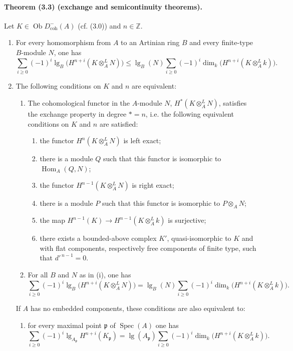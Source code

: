\documentclass[10pt]{article}
\newcommand{\Z}{\mathbb Z}
\newcommand{\Hom}{\operatorname{Hom}}
\providecommand{\Spec}{\operatorname{Spec}}
\providecommand{\lgop}{\operatorname{lg}}
\providecommand{\Ob}{\operatorname{Ob}}
\begin{document}
\paragraph{Theorem (3.3) (exchange and semicontinuity theorems).} Let $K\in\Ob D^-_{\mathrm{coh}}(A)$ (cf. (3.0)) and $n\in\Z$.
\begin{enumerate}[label=(\roman*)]
\item For every homomorphism from $A$ to an Artinian ring $B$ and every finite-type $B$-module $N$, one has
\[
\tag{3.3.1}
\sum_{i\ge0}(-1)^i\lgop_B\bigl(H^{n+i}(K\otimes_A^L N)\bigr)
\le
\lgop_B(N)\sum_{i\ge0}(-1)^i\dim_k\bigl(H^{n+i}(K\otimes_A^L k)\bigr).
\]
\item The following conditions on $K$ and $n$ are equivalent:
\begin{enumerate}[label=\alph*)]
\item The cohomological functor in the $A$-module $N$, $H^*(K\otimes_A^L N)$, satisfies the exchange property in degree $*=n$, i.e. the following equivalent conditions on $K$ and $n$ are satisfied:
\begin{enumerate}[label=a.\arabic*)]
\item the functor $H^n(K\otimes_A^L N)$ is left exact;
\item there is a module $Q$ such that this functor is isomorphic to $\Hom_A(Q,N)$;
\item the functor $H^{n-1}(K\otimes_A^L N)$ is right exact;
\item there is a module $P$ such that this functor is isomorphic to $P\otimes_A N$;
\item the map $H^{n-1}(K)\to H^{n-1}(K\otimes_A^L k)$ is surjective;
\item there exists a bounded-above complex $K'$, quasi-isomorphic to $K$ and with flat components, respectively free components of finite type, such that $d'^{\,n-1}=0$.
\end{enumerate}
\item For all $B$ and $N$ as in (i), one has
\[
\tag{3.3.2}
\sum_{i\ge0}(-1)^i\lgop_B\bigl(H^{n+i}(K\otimes_A^L N)\bigr)
=
\lgop_B(N)\sum_{i\ge0}(-1)^i\dim_k\bigl(H^{n+i}(K\otimes_A^L k)\bigr).
\]
\end{enumerate}
If $A$ has no embedded components, these conditions are also equivalent to:
\begin{enumerate}[label=\alph*),start=3]
\item for every maximal point $\mathfrak p$ of $\Spec(A)$ one has
\[
\tag{3.3.2'}
\sum_{i\ge0}(-1)^i\lgop_{A_\mathfrak p}H^{n+i}(K_\mathfrak p)=
\lgop(A_\mathfrak p)\sum_{i\ge0}(-1)^i\dim_k\bigl(H^{n+i}(K\otimes_A^L k)\bigr).
\]
\end{enumerate}
\end{enumerate}
\end{document}
